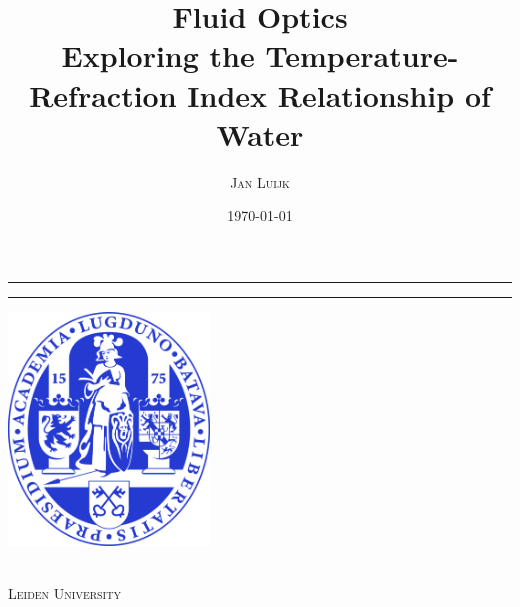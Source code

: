 \documentclass[a4paper, 11pt]{article}
\title{\textbf{Fluid Optics}\\
Exploring the Temperature-Refraction Index Relationship of Water}
\author{\textsc{Jan Luijk}}
\date{\textsc{\today}}
\makeatletter
\renewcommand{\maketitle}{ 

\begin{center} 

\rule{\linewidth}{0.5mm} %
  {\LARGE\@title}
\rule{\linewidth}{0.5mm}

\vspace{20pt} 

{\large\@author} 

\vfill

\includegraphics[width=0.400\textwidth]{logo.png}\\

\vspace{30pt} %

\@date\\ 
\textsc{Leiden University}

\end{center}
\newpage
}
\makeatother
\begin{document}
\maketitle %


\begin{abstract}

\end{abstract}
\end{document}
